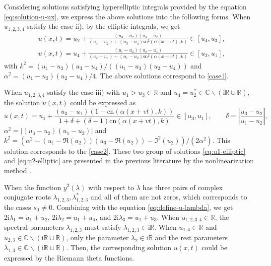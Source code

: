 \documentclass[11pt,reqno]{amsart}
\newcommand{\ii}{\mathrm{i}}
\newcommand{\sn}{\mathrm{sn}}
\newcommand{\cn}{\mathrm{cn}}
\numberwithin{equation}{section}
\begin{document}
Considering solutions satisfying hyperelliptic integrals provided by the equation \eqref{eq:solution-u-ux}, we express the above solutions 
into the following forms.
When $u_{1,2,3,4}$ satisfy the case ii), by the elliptic integrals, we get
\begin{subequations}\label{eq:u1-elliptic}
\begin{align}
	& u(x,t)  =  u_2  +  \frac{(u_3-u_2)(u_4-u_2)}{(u_4-u_2) +(u_3-u_4)\sn^2(\alpha (x+vt),k)}\in [u_4,u_3], \label{eq:u1-elliptic-1}\\
	& u(x,t)  =  u_4 +  \frac{(u_1-u_4)(u_2-u_4)}{(u_2-u_4)+(u_1-u_2)\sn^2(\alpha (x+vt),k)}\in [u_2,u_1], \label{eq:u1-elliptic-2}
\end{align}
\end{subequations}
with $k^2=(u_1-u_2)(u_3-u_4)/((u_1-u_3)(u_2-u_4))$ and $\alpha^2=(u_1-u_3)(u_2-u_4)/4$.
The above solutions correspond to \ref{case1}.

When $u_{1,2,3,4}$ satisfy the case iii) with $u_1>u_3\in \mathbb{R}$ and $u_4=u_2^*\in \mathbb{C}\backslash(\ii \mathbb{R}\cup \mathbb{R})$, 
the solution $u(x,t)$ could be expressed as 
\begin{equation}\label{eq:u2-elliptic}
	u(x,t)=u_1+\frac{(u_3-u_1)(1-\cn(\alpha(x+vt),k))}{1+\delta+(\delta-1)\cn(\alpha(x+vt),k)}\in[u_3,u_1],\qquad \delta=\left|\frac{u_3-u_2}{u_1-u_2}\right|,
\end{equation} 	
$\alpha^2=\left|(u_3-u_2)(u_1-u_2)\right|$ and $k^2=(\alpha^2-(u_1-\Re(u_2))(u_3-\Re(u_2))-\Im^2(u_2))/(2\alpha^2)$.
This solution corresponds to the \ref{case2}.
These two group of solutions \eqref{eq:u1-elliptic} and \eqref{eq:u2-elliptic} are presented in the previous literature by the nonlinearization method \cite{Chen-19-mKdV}.

When the function $y^2(\lambda)$ with respect to $\lambda$ has three pairs of complex conjugate roots $\lambda_{1,2,3},\lambda_{1,2,3}^*$ and all of them are not zeros, which corresponds to the cases $s_0\neq 0$.  Combining with the equation \eqref{eq:define-u-lambda}, we get $2\ii \lambda_1=u_1+u_2$, $2\ii \lambda_2=u_1+u_4$, and $2\ii \lambda_3=u_1+u_3$.	
When $u_{1,2,3,4}\in \mathbb{R}$, the spectral parameters $\lambda_{1,2,3}$ must satisfy $\lambda_{1,2,3}\in \ii \mathbb{R}$. 
When $u_{1,4}\in \mathbb{R}$ and $u_{2,3}\in \mathbb{C}\backslash(\ii \mathbb{R}\cup \mathbb{R})$, only the parameter $\lambda_2\in \ii \mathbb{R}$ and the rest parameters $\lambda_{1,3}\in \mathbb{C}\backslash(\ii \mathbb{R}\cup\mathbb{R})$.
Then, the corresponding solution $u(x,t)$ could be expressed by the Riemann theta functions.
	
\end{document}
